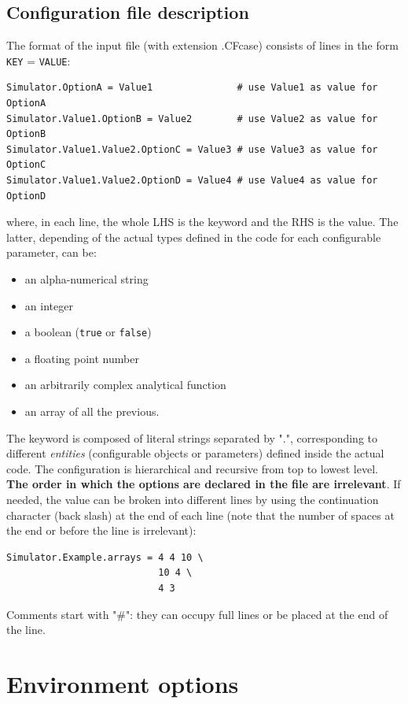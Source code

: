 \documentclass[11pt]{article}
\begin{document}
\subsection{Configuration file description}

The format of the input file (with extension .CFcase) consists of lines in the form {\tt KEY} = {\tt VALUE}:
\vspace{-0.2cm}
\begin{lstlisting}[breaklines]
Simulator.OptionA = Value1               # use Value1 as value for OptionA
Simulator.Value1.OptionB = Value2        # use Value2 as value for OptionB
Simulator.Value1.Value2.OptionC = Value3 # use Value3 as value for OptionC
Simulator.Value1.Value2.OptionD = Value4 # use Value4 as value for OptionD
\end{lstlisting} 
where, in each line, the whole LHS is the keyword and the RHS is the value. The
latter, depending of the actual types defined in the code for each configurable parameter, can be:

\begin{itemize}
\item
  an alpha-numerical string
\item
  an integer
\item 
  a boolean (\texttt{true} or \texttt{false})
\item
  a floating point number
\item
  an arbitrarily complex analytical function
\item
  an array of all the previous.
\end{itemize}
The keyword is composed of literal strings separated by ".",
corresponding to different \textit{entities} (configurable
objects or parameters) defined inside the actual code. The
configuration is hierarchical and recursive from top to lowest
level. {\bf The order in which the options are declared in the file are
  irrelevant}. If needed, the value can be broken into different lines by using the continuation character (back slash) 
at the end of each line (note that the number of spaces at the end or
before the line is irrelevant):
\vspace{-0.2cm}
\begin{lstlisting}[breaklines]
Simulator.Example.arrays = 4 4 10 \
                           10 4 \
                           4 3
\end{lstlisting}
Comments start with "\#": they can occupy full lines or be placed at the end of the line.

\section{Environment options}
\end{document}
